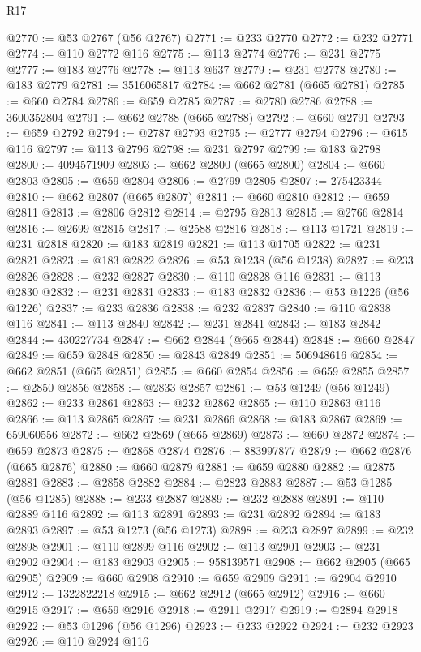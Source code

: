 \begin{lexlean}{R17}
\begin{coremodule}
@2770 := @53 @2767 (@56 @2767)
@2771 := @233 @2770
@2772 := @232 @2771
@2774 := @110 @2772 @116
@2775 := @113 @2774
@2776 := @231 @2775
@2777 := @183 @2776
@2778 := @113 @637
@2779 := @231 @2778
@2780 := @183 @2779
@2781 := 3516065817
@2784 := @662 @2781 (@665 @2781)
@2785 := @660 @2784
@2786 := @659 @2785
@2787 := @2780 @2786
@2788 := 3600352804
@2791 := @662 @2788 (@665 @2788)
@2792 := @660 @2791
@2793 := @659 @2792
@2794 := @2787 @2793
@2795 := @2777 @2794
@2796 := @615 @116
@2797 := @113 @2796
@2798 := @231 @2797
@2799 := @183 @2798
@2800 := 4094571909
@2803 := @662 @2800 (@665 @2800)
@2804 := @660 @2803
@2805 := @659 @2804
@2806 := @2799 @2805
@2807 := 275423344
@2810 := @662 @2807 (@665 @2807)
@2811 := @660 @2810
@2812 := @659 @2811
@2813 := @2806 @2812
@2814 := @2795 @2813
@2815 := @2766 @2814
@2816 := @2699 @2815
@2817 := @2588 @2816
@2818 := @113 @1721
@2819 := @231 @2818
@2820 := @183 @2819
@2821 := @113 @1705
@2822 := @231 @2821
@2823 := @183 @2822
@2826 := @53 @1238 (@56 @1238)
@2827 := @233 @2826
@2828 := @232 @2827
@2830 := @110 @2828 @116
@2831 := @113 @2830
@2832 := @231 @2831
@2833 := @183 @2832
@2836 := @53 @1226 (@56 @1226)
@2837 := @233 @2836
@2838 := @232 @2837
@2840 := @110 @2838 @116
@2841 := @113 @2840
@2842 := @231 @2841
@2843 := @183 @2842
@2844 := 430227734
@2847 := @662 @2844 (@665 @2844)
@2848 := @660 @2847
@2849 := @659 @2848
@2850 := @2843 @2849
@2851 := 506948616
@2854 := @662 @2851 (@665 @2851)
@2855 := @660 @2854
@2856 := @659 @2855
@2857 := @2850 @2856
@2858 := @2833 @2857
@2861 := @53 @1249 (@56 @1249)
@2862 := @233 @2861
@2863 := @232 @2862
@2865 := @110 @2863 @116
@2866 := @113 @2865
@2867 := @231 @2866
@2868 := @183 @2867
@2869 := 659060556
@2872 := @662 @2869 (@665 @2869)
@2873 := @660 @2872
@2874 := @659 @2873
@2875 := @2868 @2874
@2876 := 883997877
@2879 := @662 @2876 (@665 @2876)
@2880 := @660 @2879
@2881 := @659 @2880
@2882 := @2875 @2881
@2883 := @2858 @2882
@2884 := @2823 @2883
@2887 := @53 @1285 (@56 @1285)
@2888 := @233 @2887
@2889 := @232 @2888
@2891 := @110 @2889 @116
@2892 := @113 @2891
@2893 := @231 @2892
@2894 := @183 @2893
@2897 := @53 @1273 (@56 @1273)
@2898 := @233 @2897
@2899 := @232 @2898
@2901 := @110 @2899 @116
@2902 := @113 @2901
@2903 := @231 @2902
@2904 := @183 @2903
@2905 := 958139571
@2908 := @662 @2905 (@665 @2905)
@2909 := @660 @2908
@2910 := @659 @2909
@2911 := @2904 @2910
@2912 := 1322822218
@2915 := @662 @2912 (@665 @2912)
@2916 := @660 @2915
@2917 := @659 @2916
@2918 := @2911 @2917
@2919 := @2894 @2918
@2922 := @53 @1296 (@56 @1296)
@2923 := @233 @2922
@2924 := @232 @2923
@2926 := @110 @2924 @116

\end{coremodule}
\end{lexlean}
